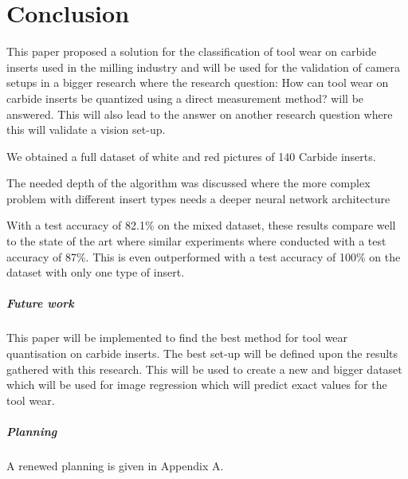 \chapter{Conclusion}
\label{chap:conc}

This paper proposed a solution for the classification of tool wear on carbide inserts used in the milling industry and will be used for the validation of camera setups in a bigger research where the research question: How can tool wear on carbide inserts be quantized using a direct measurement method? will be answered. This will also lead to the answer on another research question where this will validate a vision set-up.

We obtained a full dataset of white and red pictures of 140 Carbide inserts. 

The needed depth of the algorithm was discussed where the more complex problem with different insert types needs a deeper neural network architecture

 With a test accuracy of 82.1\% on the mixed dataset, these results compare well to the state of the art where similar experiments where conducted with a test accuracy of 87\%. This is even outperformed with a test accuracy of 100\% on the dataset with only one type of insert.
 
\paragraph{Future work}
 This paper will be implemented to find the best method for tool wear quantisation on carbide inserts. The best set-up will be defined upon the results gathered with this research. This will be used to create a new and bigger dataset which will be used for image regression which will predict exact values for the tool wear.
 
 \paragraph{Planning}
A renewed planning is given in Appendix A. 
 